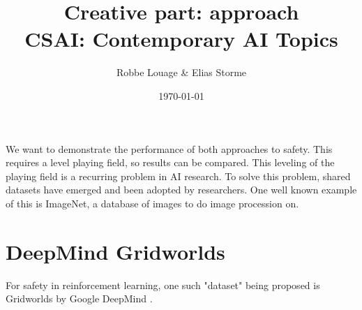 \documentclass[a4paper,kul]{kulakarticle}
\begin{document}
\title{}
\title{Creative part: approach\\CSAI: Contemporary AI Topics}
\author{Robbe Louage \& Elias Storme}
\date{\today}
\maketitle
\vspace{1.5em}

We want to demonstrate the performance of both approaches to safety. This requires a level 
playing field, so results can be compared. This leveling of the playing field is a recurring 
problem in AI research. To solve this problem, shared datasets have emerged and been adopted by researchers. One well known example of this is ImageNet, a database of images to do image procession on.
\section{DeepMind Gridworlds}
For safety in reinforcement learning, one such "dataset" being proposed is Gridworlds by Google DeepMind \cite{leike2017ai}. 



\end{document}
